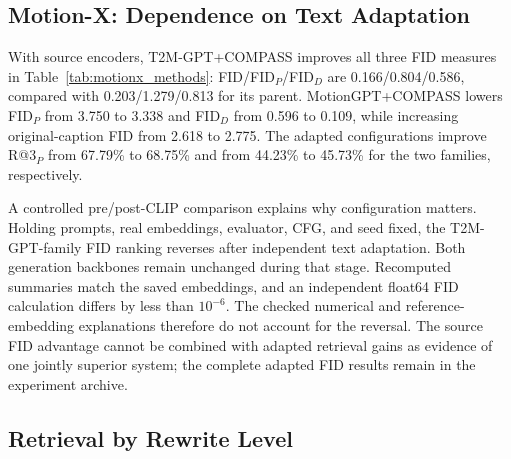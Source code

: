 \subsection{Motion-X: Dependence on Text Adaptation}
\begin{table}[t]
\centering
\caption{HumanML3D retrieval after independent text adaptation, CFG=1.3. Each level has 4,380 prompt--motion pairs, one generation seed, and 20 shared random candidate partitions of at most 32, with the tail retained. The rewritten text is used for both generation and retrieval. Bold marks the within-family best point estimate. Values are percentages.}
\label{tab:humanml_independent_cfg}
\resulttablesetup

\end{table}
\begin{table}[t]
\centering
\caption{Motion-X retrieval on 7,679 pairs per level, using the protocol in Table~\ref{tab:humanml_independent_cfg} and the frozen Motion-X paraphrase-aware evaluator with lowercase fallback. Bold marks the within-family best. Values are point estimates in percent, not generation-seed means and deviations.}
\label{tab:motionx_independent_cfg}
\resulttablesetup

\end{table}
With source encoders, T2M-GPT+COMPASS improves all three FID measures in
Table~\ref{tab:motionx_methods}: FID/FID$_P$/FID$_D$ are 0.166/0.804/0.586,
compared with 0.203/1.279/0.813 for its parent. MotionGPT+COMPASS lowers
FID$_P$ from 3.750 to 3.338 and FID$_D$ from 0.596 to 0.109, while increasing
original-caption FID from 2.618 to 2.775. The adapted configurations improve
R@3$_P$ from 67.79\% to 68.75\% and from 44.23\% to 45.73\% for the
two families, respectively.

A controlled pre/post-CLIP comparison explains why configuration matters.
Holding prompts, real embeddings, evaluator, CFG, and seed fixed, the
T2M-GPT-family FID ranking reverses after independent text adaptation.
Both generation backbones remain unchanged during that stage. Recomputed
summaries match the saved embeddings, and an independent float64 FID
calculation differs by less than $10^{-6}$. The checked numerical and
reference-embedding explanations therefore do not account for the reversal.
The source FID advantage cannot be combined with adapted retrieval gains as
evidence of one jointly superior system; the complete adapted FID results
remain in the experiment archive.

\subsection{Retrieval by Rewrite Level}
\begin{table}[t]
\centering
\caption{Native KIT-ML on 734 prompt pairs, CFG=1.3, using the shared KIT evaluator selected on official validation data. FID variants use source encoders; other columns use adapted encoders and separate generations. Bold marks the column best; diversity is closest to 11.148. Retrieval is in percent.}
\label{tab:cross_dataset}
\resulttablesetup

\end{table}


